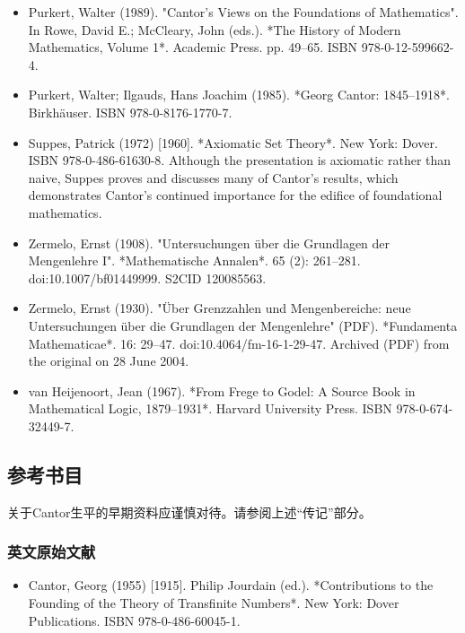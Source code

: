 \begin{itemize}
\item Purkert, Walter (1989). "Cantor's Views on the Foundations of Mathematics". In Rowe, David E.; McCleary, John (eds.). *The History of Modern Mathematics, Volume 1*. Academic Press. pp. 49–65. ISBN 978-0-12-599662-4.  
\item Purkert, Walter; Ilgauds, Hans Joachim (1985). *Georg Cantor: 1845–1918*. Birkhäuser. ISBN 978-0-8176-1770-7.  
\item Suppes, Patrick (1972) [1960]. *Axiomatic Set Theory*. New York: Dover. ISBN 978-0-486-61630-8. Although the presentation is axiomatic rather than naive, Suppes proves and discusses many of Cantor's results, which demonstrates Cantor's continued importance for the edifice of foundational mathematics.  
\item Zermelo, Ernst (1908). "Untersuchungen über die Grundlagen der Mengenlehre I". *Mathematische Annalen*. 65 (2): 261–281. doi:10.1007/bf01449999. S2CID 120085563.  
\item Zermelo, Ernst (1930). "Über Grenzzahlen und Mengenbereiche: neue Untersuchungen über die Grundlagen der Mengenlehre" (PDF). *Fundamenta Mathematicae*. 16: 29–47. doi:10.4064/fm-16-1-29-47. Archived (PDF) from the original on 28 June 2004.  
\item van Heijenoort, Jean (1967). *From Frege to Godel: A Source Book in Mathematical Logic, 1879–1931*. Harvard University Press. ISBN 978-0-674-32449-7. 
\end{itemize} 
\subsection{参考书目}  
关于Cantor生平的早期资料应谨慎对待。请参阅上述“传记”部分。  
\subsubsection{英文原始文献}  
\begin{itemize}
\item Cantor, Georg (1955) [1915]. Philip Jourdain (ed.). *Contributions to the Founding of the Theory of Transfinite Numbers*. New York: Dover Publications. ISBN 978-0-486-60045-1.  
\end{itemize}
